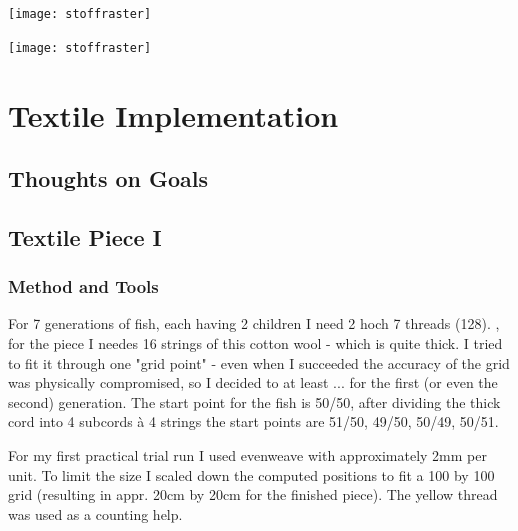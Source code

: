 \documentclass{scrartcl}
\begin{document}
\begin{minipage}[t]{0.48\textwidth}
    \texttt{[image: stoffraster]}
\end{minipage}
\hspace{0.5cm}
\begin{minipage}[t]{0.48\textwidth}
    \texttt{[image: stoffraster]}
\end{minipage}
\vspace{0.5cm}

\section{Textile Implementation}

\subsection{Thoughts on Goals}


\subsection{Textile Piece I}
\subsubsection{Method and Tools}

For 7 generations of fish, each having 2 children I need 2 hoch 7 threads (128). , for the piece I needes 16 strings of this cotton wool - which is quite thick. I tried to fit it through one "grid point" - even when I succeeded the accuracy of the grid was physically compromised, so I decided to at least ... for the first (or even the second) generation. The start point for the fish is 50/50, after dividing the thick cord into 4 subcords à 4 strings the start points are 51/50, 49/50, 50/49, 50/51.\\

\begin{minipage}[t]{0.48\textwidth}
\end{minipage}
\hspace{0.5cm}
\begin{minipage}[t]{0.48\textwidth}
    For my first practical trial run I used evenweave with approximately 2mm per unit. To limit the size I scaled down the computed positions to fit a 100 by 100 grid (resulting in appr. 20cm by 20cm for the finished piece). The yellow thread was used as a counting help.
\end{minipage}
\vspace{0.5cm}
\end{document}
